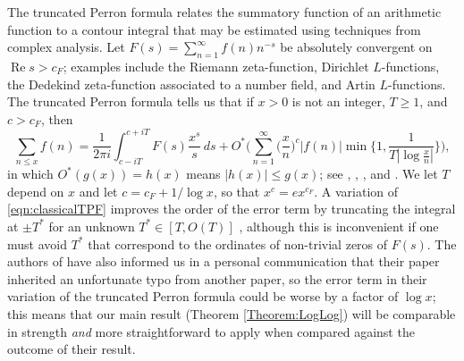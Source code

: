 \documentclass[10pt,reqno]{amsart}
\theoremstyle{plain}
\theoremstyle{definition}
\renewcommand{\Re}{\operatorname{Re}}
\begin{document}
The truncated Perron formula relates the summatory function of an arithmetic function to a contour integral that may be estimated using techniques from complex analysis. Let $F(s) = \sum_{n=1}^{\infty} f(n) n^{-s}$ be absolutely convergent on $\Re s > c_F$;
examples include the Riemann zeta-function, Dirichlet $L$-functions, 
the Dedekind zeta-function associated to a number field, and Artin $L$-functions. 
The truncated Perron formula tells us that if $x>0$ is not an integer, 
$T\geq 1$, and $c > c_F$, then
\begin{equation}\label{eqn:classicalTPF}
    \sum_{n \leq x} f(n) = \frac{1}{2\pi i }\int_{c-iT}^{c+iT} F(s) \frac{x^s}{s}\,ds + 
    O^*\bigg( \sum_{n=1}^{\infty} \bigg( \frac{x}{n} \bigg)^{c} |f(n)| \min\Big\{ 1, \frac{1}{T |\log \frac{x}{n}|}\Big\}\bigg),
\end{equation}
in which $O^*(g(x)) = h(x)$ means $|h(x)|\leq g(x)$; see \cite[Ex.~4.4.15]{MurtyAnalytic}, \cite[Ch.~7]{Koukoulopoulos}, \cite[Sect.~II.2]{Tenenbaum}, and \cite[Sect.~5.1]{MontgomeryVaughan}. We let $T$ depend on $x$ and let $c = c_F + 1/\log{x}$, so that $x^c = ex^{c_F}$. A variation of \eqref{eqn:classicalTPF} improves the order of the error term by truncating the integral at $\pm T^*$ for an unknown $T^*\in [T,O(T)]$ \cite{CullyHugillJohnston}, although this is inconvenient if one must avoid $T^*$ that correspond to the ordinates of non-trivial zeros of $F(s)$. The authors of \cite{CullyHugillJohnston} have also informed us in a personal communication that their paper inherited an unfortunate typo from another paper, so the error term in their variation of the truncated Perron formula could be worse by a factor of $\log{x}$; this means that our main result (Theorem \ref{Theorem:LogLog}) will be comparable in strength \textit{and} more straightforward to apply when compared against the outcome of their result.
\end{document}
